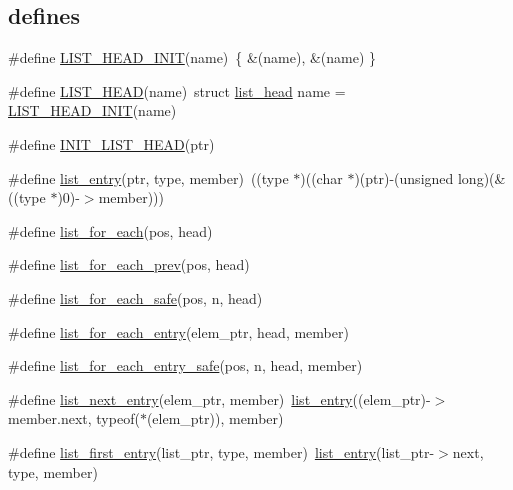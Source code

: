 \subsection*{\textquotesingle{}defines\textquotesingle{}}
\begin{DoxyCompactItemize}
\item 
\#define \hyperlink{G-2313-06-P1__list_8h_a4642d4b7df28478bb762fe43c85b5c63}{L\+I\+S\+T\+\_\+\+H\+E\+A\+D\+\_\+\+I\+N\+I\+T}(name)~\{ \&(name), \&(name) \}
\item 
\#define \hyperlink{G-2313-06-P1__list_8h_a42f0e72af970a790b60a740af8c9ecd0}{L\+I\+S\+T\+\_\+\+H\+E\+A\+D}(name)~struct \hyperlink{structlist__head}{list\+\_\+head} name = \hyperlink{G-2313-06-P1__list_8h_a4642d4b7df28478bb762fe43c85b5c63}{L\+I\+S\+T\+\_\+\+H\+E\+A\+D\+\_\+\+I\+N\+I\+T}(name)
\item 
\#define \hyperlink{G-2313-06-P1__list_8h_a0ffe9d28c36d7b018a9cfae33bae45c0}{I\+N\+I\+T\+\_\+\+L\+I\+S\+T\+\_\+\+H\+E\+A\+D}(ptr)
\item 
\#define \hyperlink{G-2313-06-P1__list_8h_a26c976b7f654e70df318c1843e5094de}{list\+\_\+entry}(ptr,  type,  member)~((type $\ast$)((char $\ast$)(ptr)-\/(unsigned long)(\&((type $\ast$)0)-\/$>$member)))
\item 
\#define \hyperlink{G-2313-06-P1__list_8h_ab8b24e6660ab3760c923e4b4db3fa502}{list\+\_\+for\+\_\+each}(pos,  head)
\item 
\#define \hyperlink{G-2313-06-P1__list_8h_a19fc06b83f3502a83ce566b8887e6aec}{list\+\_\+for\+\_\+each\+\_\+prev}(pos,  head)
\item 
\#define \hyperlink{G-2313-06-P1__list_8h_a9e4b9328744994b9d3878f5dad75c09f}{list\+\_\+for\+\_\+each\+\_\+safe}(pos,  n,  head)
\item 
\#define \hyperlink{G-2313-06-P1__list_8h_aa728613529c4fc5383f80b3d733b4153}{list\+\_\+for\+\_\+each\+\_\+entry}(elem\+\_\+ptr,  head,  member)
\item 
\#define \hyperlink{G-2313-06-P1__list_8h_ac3f72d6bd5144c7970824813810d2da1}{list\+\_\+for\+\_\+each\+\_\+entry\+\_\+safe}(pos,  n,  head,  member)
\item 
\#define \hyperlink{G-2313-06-P1__list_8h_a853740b546497b17a28faf076cf3f6a0}{list\+\_\+next\+\_\+entry}(elem\+\_\+ptr,  member)~\hyperlink{G-2313-06-P1__list_8h_a26c976b7f654e70df318c1843e5094de}{list\+\_\+entry}((elem\+\_\+ptr)-\/$>$member.\+next, typeof($\ast$(elem\+\_\+ptr)), member)
\item 
\#define \hyperlink{G-2313-06-P1__list_8h_a894172f609f0f81a2d6ffdcd7ac1954f}{list\+\_\+first\+\_\+entry}(list\+\_\+ptr,  type,  member)~\hyperlink{G-2313-06-P1__list_8h_a26c976b7f654e70df318c1843e5094de}{list\+\_\+entry}(list\+\_\+ptr-\/$>$next, type, member)
\end{DoxyCompactItemize}


